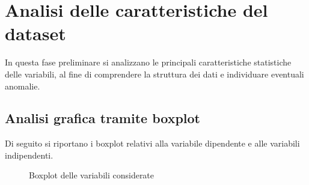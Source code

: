 \section{Analisi delle caratteristiche del dataset}
In questa fase preliminare si analizzano le principali caratteristiche statistiche delle variabili, al fine di comprendere la struttura dei dati e individuare eventuali anomalie.

\subsection{Analisi grafica tramite boxplot}
Di seguito si riportano i boxplot relativi alla variabile dipendente e alle variabili indipendenti.

\begin{figure}[H]
	\centering
	
	\vspace{1em} %
	
	\caption{Boxplot delle variabili considerate}
	\label{fig:boxplot_variabili}
\end{figure}


